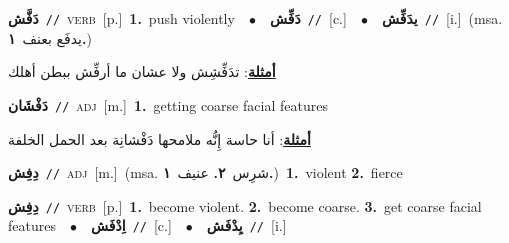 \documentclass[10pt,a4paper,twoside]{article} %
\begin{document}
\begin{multicols}{2}
{\setlength\topsep{0pt}\textbf{\foreignlanguage{arabic}{دَفَّش}}\ {\color{gray}\texttt{//}\color{black}}\ \textsc{verb}\ [p.]\ \textbf{1.}~push violently\ \ $\bullet$\ \ \setlength\topsep{0pt}\textbf{\foreignlanguage{arabic}{دَفِّش}}\ {\color{gray}\texttt{//}\color{black}}\ [c.]\ \ $\bullet$\ \ \setlength\topsep{0pt}\textbf{\foreignlanguage{arabic}{يدَفِّش}}\ {\color{gray}\texttt{//}\color{black}}\ [i.]\ \color{gray}(msa. \foreignlanguage{arabic}{يدفَع بعنف}~\foreignlanguage{arabic}{\textbf{١.}})\color{black}\  \begin{flushright}\color{gray}\foreignlanguage{arabic}{\textbf{\underline{\foreignlanguage{arabic}{أمثلة}}}: تدَفِّشِش ولا عشان ما أرفِّش ببطن أهلك}\end{flushright}\color{black}} \vspace{2mm}

{\setlength\topsep{0pt}\textbf{\foreignlanguage{arabic}{دَفْشَان}}\ {\color{gray}\texttt{//}\color{black}}\ \textsc{adj}\ [m.]\ \textbf{1.}~getting coarse facial features\  \begin{flushright}\color{gray}\foreignlanguage{arabic}{\textbf{\underline{\foreignlanguage{arabic}{أمثلة}}}: أنا حاسة إِنُّه ملامحها دَفْشانِة بعد الحمل الخلفة}\end{flushright}\color{black}} \vspace{2mm}

{\setlength\topsep{0pt}\textbf{\foreignlanguage{arabic}{دِفِش}}\ {\color{gray}\texttt{//}\color{black}}\ \textsc{adj}\ [m.]\ \color{gray}(msa. \foreignlanguage{arabic}{شرِس}~\foreignlanguage{arabic}{\textbf{٢.}}  \foreignlanguage{arabic}{عنيف}~\foreignlanguage{arabic}{\textbf{١.}})\color{black}\ \textbf{1.}~violent  \textbf{2.}~fierce\ } \vspace{2mm}

{\setlength\topsep{0pt}\textbf{\foreignlanguage{arabic}{دِفِش}}\ {\color{gray}\texttt{//}\color{black}}\ \textsc{verb}\ [p.]\ \textbf{1.}~become violent.  \textbf{2.}~become coarse.  \textbf{3.}~get coarse facial features\ \ $\bullet$\ \ \setlength\topsep{0pt}\textbf{\foreignlanguage{arabic}{اِدْفَش}}\ {\color{gray}\texttt{//}\color{black}}\ [c.]\ \ $\bullet$\ \ \setlength\topsep{0pt}\textbf{\foreignlanguage{arabic}{يِدْفَش}}\ {\color{gray}\texttt{//}\color{black}}\ [i.]\ } \vspace{2mm}


\end{multicols}
\end{document}
